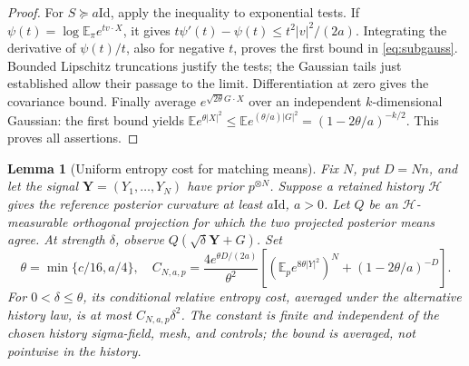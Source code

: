 \documentclass[11pt]{article}
\newtheorem{lemma}[theorem]{Lemma}
\theoremstyle{remark}\newtheorem{remark}[theorem]{Remark}
\newcommand{\E}{\mathbb E}
\newcommand{\Id}{\mathrm{Id}}
\begin{document}
\begin{proof}
For $S\succeq a\Id$, apply the inequality to exponential tests.
If $\psi(t)=\log\E_\pi e^{t v\cdot X}$, it gives
$t\psi'(t)-\psi(t)\le t^2|v|^2/(2a)$.
Integrating the derivative of $\psi(t)/t$, also for negative $t$, proves the
first bound in \eqref{eq:subgauss}. Bounded Lipschitz truncations justify the
tests; the Gaussian tails just established allow their passage to the limit.
Differentiation at zero gives the covariance bound. Finally average
$e^{\sqrt{2\theta}G\cdot X}$ over an independent $k$-dimensional Gaussian:
the first bound yields
$\E e^{\theta|X|^2}\le\E e^{(\theta/a)|G|^2}
=(1-2\theta/a)^{-k/2}$. This proves all assertions.
\end{proof}

\begin{lemma}[Uniform entropy cost for matching means]\label{lem:cost}
Fix $N$, put $D=Nn$, and let the signal $\mathbf Y=(Y_1,\ldots,Y_N)$ have
prior $p^{\otimes N}$. Suppose a retained history $\mathcal H$ gives the
reference posterior curvature at least $a\Id$, $a>0$. Let $Q$ be an
$\mathcal H$-measurable orthogonal projection for which the two projected
posterior means agree. At strength $\delta$, observe $Q(\sqrt\delta\mathbf Y+G)$.
Set
\[
\theta=\min\{c/16,a/4\},\quad
C_{N,a,p}=\frac{4e^{\theta D/(2a)}}{\theta^2}
\left[(\E_p e^{8\theta|Y|^2})^N+(1-2\theta/a)^{-D}\right].
\]
For $0<\delta\le\theta$, its conditional relative entropy cost, averaged
under the alternative history law, is at most $C_{N,a,p}\delta^2$.
The constant is finite and independent of the chosen history sigma-field,
mesh, and controls; the bound is averaged, not pointwise in the history.
\end{lemma}
\end{document}
